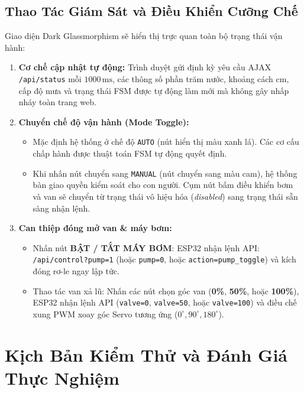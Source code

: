 \subsection{Thao Tác Giám Sát và Điều Khiển Cưỡng Chế}
Giao diện Dark Glassmorphism sẽ hiển thị trực quan toàn bộ trạng thái vận hành:
\begin{enumerate}
    \item \textbf{Cơ chế cập nhật tự động:} Trình duyệt gửi định kỳ yêu cầu AJAX \texttt{/api/status} mỗi $1000\,\text{ms}$, các thông số phần trăm nước, khoảng cách $\text{cm}$, cấp độ mưa và trạng thái FSM được tự động làm mới mà không gây nhấp nháy toàn trang web.
    \item \textbf{Chuyển chế độ vận hành (Mode Toggle):}
    \begin{itemize}
        \item Mặc định hệ thống ở chế độ \texttt{AUTO} (nút hiển thị màu xanh lá). Các cơ cấu chấp hành được thuật toán FSM tự động quyết định.
        \item Khi nhấn nút chuyển sang \texttt{MANUAL} (nút chuyển sang màu cam), hệ thống bàn giao quyền kiểm soát cho con người. Cụm nút bấm điều khiển bơm và van sẽ chuyển từ trạng thái vô hiệu hóa (\textit{disabled}) sang trạng thái sẵn sàng nhận lệnh.
    \end{itemize}
    \item \textbf{Can thiệp đóng mở van \& máy bơm:}
    \begin{itemize}
        \item Nhấn nút \textbf{BẬT / TẮT MÁY BƠM}: ESP32 nhận lệnh API:
        \newline
        \texttt{/api/control?pump=1} (hoặc \texttt{pump=0}, hoặc \texttt{action=pump\_toggle})
        \newline
        và kích đóng rơ-le ngay lập tức.
        \item Thao tác van xả lũ: Nhấn các nút chọn góc van (\textbf{0\%}, \textbf{50\%}, hoặc \textbf{100\%}), ESP32 nhận lệnh API (\texttt{valve=0}, \texttt{valve=50}, hoặc \texttt{valve=100}) và điều chế xung PWM xoay góc Servo tương ứng ($0^\circ, 90^\circ, 180^\circ$).
    \end{itemize}
\end{enumerate}

\section{Kịch Bản Kiểm Thử và Đánh Giá Thực Nghiệm}

